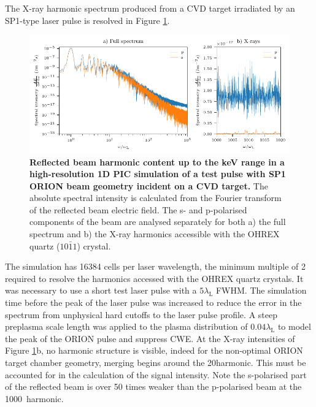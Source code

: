 The X-ray harmonic spectrum produced from a CVD target irradiated by an SP1-type laser pulse is resolved in Figure \ref{fig:orionxrayharmonics}.
\begin{figure}
	\centering
	\includegraphics{figures/orion/orion_xray_harmonics}
	\caption[Reflected beam harmonic content up to the keV range in a high-resolution 1D PIC simulation.]{\textbf{Reflected beam harmonic content up to the keV range in a high-resolution 1D PIC simulation of a test pulse with SP1 ORION beam geometry incident on a CVD target.} The absolute spectral intensity is calculated from the Fourier transform of the reflected beam electric field. The s- and p-polarised components of the beam are analysed separately for both a) the full spectrum and b) the X-ray harmonics accessible with the OHREX quartz ($10\bar{1}1$) crystal.}
	\label{fig:orionxrayharmonics}
\end{figure}
The simulation has 16384 cells per laser wavelength, the minimum multiple of 2 required to resolve the harmonics accessed with the OHREX quartz crystals. It was necessary to use a short test laser pulse with a $5\lambda_\mathrm{L}$ FWHM. The simulation time before the peak of the laser pulse was increased to reduce the error in the spectrum from unphysical hard cutoffs to the laser pulse profile. A steep preplasma scale length was applied to the plasma distribution of $0.04\lambda_\mathrm{L}$ to model the peak of the ORION pulse and suppress \ac{CWE}. 
At the X-ray intensities of Figure \ref{fig:orionxrayharmonics}b, no harmonic structure is visible, indeed for the non-optimal ORION target chamber geometry, merging begins around the 20\th harmonic. This must be accounted for in the calculation of the signal intensity. Note the s-polarised part of the reflected beam is over 50 times weaker than the p-polarised beam at the 1000\th\ harmonic.

